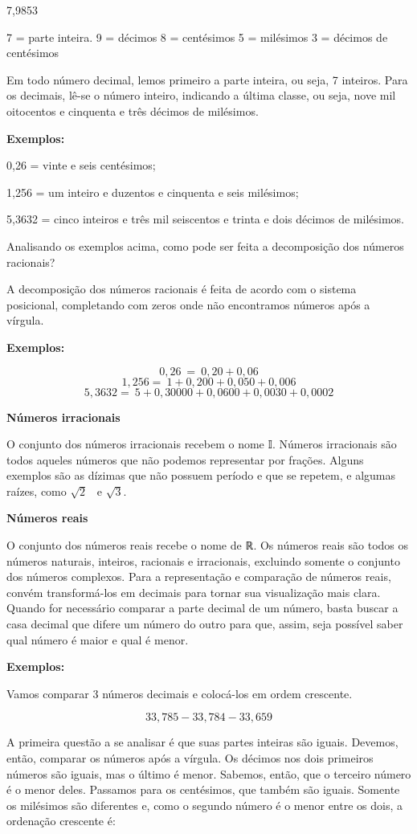 7,9853

7 = parte inteira. 9 = décimos 8 = centésimos 5 = milésimos 3 = décimos
de centésimos

Em todo número decimal, lemos primeiro a parte inteira, ou seja, 7
inteiros. Para os decimais, lê-se o número inteiro, indicando a última
classe, ou seja, nove mil oitocentos e cinquenta e três décimos de
milésimos.

\textbf{Exemplos:}

0,26 = vinte e seis centésimos;

1,256 = um inteiro e duzentos e cinquenta e seis milésimos;

5,3632 = cinco inteiros e três mil seiscentos e trinta e dois décimos de
milésimos.

Analisando os exemplos acima, como pode ser feita a decomposição dos
números racionais?

A decomposição dos números racionais é feita de acordo com o sistema
posicional, completando com zeros onde não encontramos números após a
vírgula.~

\textbf{Exemplos:}

$$0,26\  = \ 0,20 + 0,06$$
$$1,256 = \ 1 + 0,200 + 0,050 + 0,006$$
$$5,3632 = \ 5 + 0,30000 + 0,0600 + 0,0030 + 0,0002$$

\textbf{Números irracionais}

O conjunto dos números irracionais recebem o nome 𝕀. Números irracionais
são todos aqueles números que não podemos representar por frações.
Alguns exemplos são as dízimas que não possuem período e que se repetem,
e algumas raízes, como $\sqrt{2}$ \ e $\sqrt{3}$.

\textbf{Números reais}

O conjunto dos números reais recebe o nome de ℝ. Os números reais são
todos os números naturais, inteiros, racionais e irracionais, excluindo
somente o conjunto dos números complexos. Para a representação e
comparação de números reais, convém transformá-los em decimais para
tornar sua visualização mais clara. Quando for necessário comparar a
parte decimal de um número, basta buscar a casa decimal que difere um
número do outro para que, assim, seja possível saber qual número é maior
e qual é menor.

\textbf{Exemplos:}

Vamos comparar 3 números decimais e colocá-los em ordem crescente.

$$33,785  - 33,784  - 33,659$$

A primeira questão a se analisar é que suas partes inteiras são iguais.
Devemos, então, comparar os números após a vírgula. Os décimos nos dois
primeiros números são iguais, mas o último é menor. Sabemos, então, que
o terceiro número é o menor deles. Passamos para os centésimos, que
também são iguais. Somente os milésimos são diferentes e, como o segundo
número é o menor entre os dois, a ordenação crescente é:

